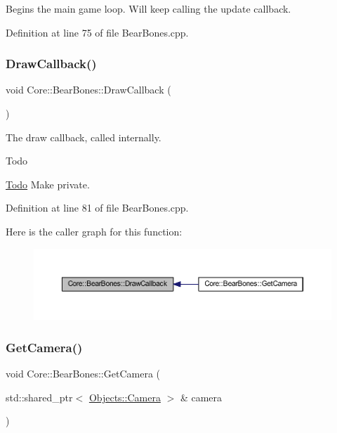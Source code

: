 Begins the main game loop. Will keep calling the update callback. 

Definition at line 75 of file Bear\+Bones.\+cpp.

\mbox{\label{class_core_1_1_bear_bones_aae597be3992d3095612317decd91a55d}} 
\subsubsection{\texorpdfstring{Draw\+Callback()}{DrawCallback()}}
{\footnotesize\ttfamily void Core\+::\+Bear\+Bones\+::\+Draw\+Callback (\begin{DoxyParamCaption}{ }\end{DoxyParamCaption})}

The draw callback, called internally. \begin{DoxyRefDesc}{Todo}
\item[\hyperlink{todo__todo000001}{Todo}]Make private. \end{DoxyRefDesc}


Definition at line 81 of file Bear\+Bones.\+cpp.

Here is the caller graph for this function\+:
\nopagebreak
\begin{figure}[H]
\begin{center}
\leavevmode
\includegraphics[width=350pt]{class_core_1_1_bear_bones_aae597be3992d3095612317decd91a55d_icgraph}
\end{center}
\end{figure}
\mbox{\label{class_core_1_1_bear_bones_a4566808b082431ab19831dee7afd700b}} 
\subsubsection{\texorpdfstring{Get\+Camera()}{GetCamera()}}
{\footnotesize\ttfamily void Core\+::\+Bear\+Bones\+::\+Get\+Camera (\begin{DoxyParamCaption}\item[{std\+::shared\+\_\+ptr$<$ \hyperlink{class_objects_1_1_camera}{Objects\+::\+Camera} $>$ \&}]{camera }\end{DoxyParamCaption})}

